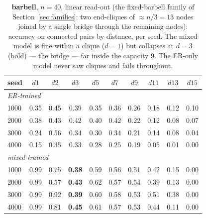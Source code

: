 \documentclass[11pt,a4paper]{article}
\begin{document}
\begin{table}[H]\centering\small
\begin{tabular}{lccccccccc}
\toprule
seed & $d1$ & $d2$ & $d3$ & $d5$ & $d7$ & $d9$ & $d11$ & $d13$ & $d15$ \\
\midrule
\multicolumn{10}{l}{\emph{ER-trained}}\\
1000 & 0.35 & 0.45 & 0.39 & 0.35 & 0.36 & 0.26 & 0.18 & 0.12 & 0.10 \\
2000 & 0.38 & 0.43 & 0.42 & 0.40 & 0.42 & 0.22 & 0.12 & 0.08 & 0.07 \\
3000 & 0.24 & 0.56 & 0.34 & 0.30 & 0.34 & 0.21 & 0.14 & 0.08 & 0.04 \\
4000 & 0.15 & 0.35 & 0.33 & 0.28 & 0.25 & 0.19 & 0.05 & 0.01 & 0.00 \\
\midrule
\multicolumn{10}{l}{\emph{mixed-trained}}\\
1000 & 0.99 & 0.75 & \textbf{0.38} & 0.59 & 0.56 & 0.51 & 0.42 & 0.15 & 0.00 \\
2000 & 0.99 & 0.57 & \textbf{0.43} & 0.62 & 0.57 & 0.54 & 0.39 & 0.13 & 0.00 \\
3000 & 0.99 & 0.92 & \textbf{0.39} & 0.60 & 0.58 & 0.53 & 0.51 & 0.38 & 0.00 \\
4000 & 0.99 & 0.81 & \textbf{0.45} & 0.61 & 0.57 & 0.53 & 0.44 & 0.11 & 0.00 \\
\bottomrule\end{tabular}
\caption{\textbf{barbell}, $n=40$, linear read-out (the fixed-barbell family of
Section~\ref{sec:families}: two end-cliques of $\approx n/3 = 13$ nodes joined by a single bridge
through the remaining nodes): accuracy on connected pairs by distance, per seed. The mixed
model is fine within a clique ($d=1$) but collapses at $d=3$ (bold) --- the bridge --- far inside
the capacity $9$. The ER-only model never saw cliques and fails throughout.}
\label{tab:bar_n40}
\end{table}
\end{document}
